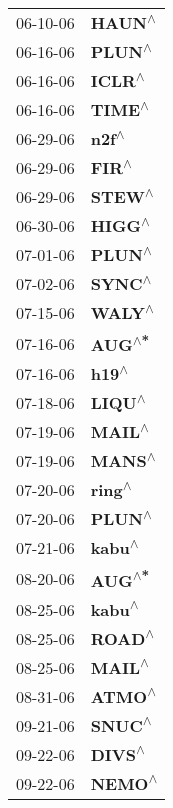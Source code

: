 \begin{supertabular}{p{0.08\textwidth}p{0.2\textwidth}}
 06-10-06 &    \textbf{HAUN\textsuperscript{$\wedge$}} \\
 06-16-06 &    \textbf{PLUN\textsuperscript{$\wedge$}} \\
 06-16-06 &    \textbf{ICLR\textsuperscript{$\wedge$}} \\
 06-16-06 &    \textbf{TIME\textsuperscript{$\wedge$}} \\
 06-29-06 &     \textbf{n2f\textsuperscript{$\wedge$}} \\
 06-29-06 &     \textbf{FIR\textsuperscript{$\wedge$}} \\
 06-29-06 &    \textbf{STEW\textsuperscript{$\wedge$}} \\
 06-30-06 &    \textbf{HIGG\textsuperscript{$\wedge$}} \\
 07-01-06 &    \textbf{PLUN\textsuperscript{$\wedge$}} \\
 07-02-06 &    \textbf{SYNC\textsuperscript{$\wedge$}} \\
 07-15-06 &    \textbf{WALY\textsuperscript{$\wedge$}} \\
 07-16-06 &    \textbf{AUG\textsuperscript{$\wedge$*}} \\
 07-16-06 &     \textbf{h19\textsuperscript{$\wedge$}} \\
 07-18-06 &    \textbf{LIQU\textsuperscript{$\wedge$}} \\
 07-19-06 &    \textbf{MAIL\textsuperscript{$\wedge$}} \\
 07-19-06 &    \textbf{MANS\textsuperscript{$\wedge$}} \\
 07-20-06 &    \textbf{ring\textsuperscript{$\wedge$}} \\
 07-20-06 &    \textbf{PLUN\textsuperscript{$\wedge$}} \\
 07-21-06 &    \textbf{kabu\textsuperscript{$\wedge$}} \\
 08-20-06 &    \textbf{AUG\textsuperscript{$\wedge$*}} \\
 08-25-06 &    \textbf{kabu\textsuperscript{$\wedge$}} \\
 08-25-06 &    \textbf{ROAD\textsuperscript{$\wedge$}} \\
 08-25-06 &    \textbf{MAIL\textsuperscript{$\wedge$}} \\
 08-31-06 &    \textbf{ATMO\textsuperscript{$\wedge$}} \\
 09-21-06 &    \textbf{SNUC\textsuperscript{$\wedge$}} \\
 09-22-06 &    \textbf{DIVS\textsuperscript{$\wedge$}} \\
 09-22-06 &    \textbf{NEMO\textsuperscript{$\wedge$}} \\

\end{supertabular}
